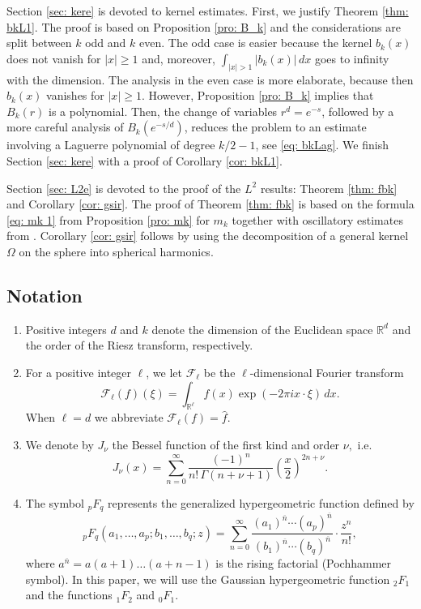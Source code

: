 \documentclass[a4paper,12pt,reqno]{amsart}
\numberwithin{equation}{section}
\theoremstyle{definition}
\newcommand{\R}{\mathbb{R}}
\newcommand{\mF}{\mathcal{F}}
\renewcommand{\ge}{\geqslant}
\begin{document}
Section \ref{sec: kere} is devoted to kernel estimates. First, we justify Theorem \ref{thm: bkL1}. The proof is based on Proposition \ref{pro: B_k} and the considerations are split between $k$ odd and $k$ even. The odd case is easier because the kernel $b_k(x)$ does not vanish for $|x|\ge 1$ and, moreover, $\int_{|x|>1}|b_k(x)|\,dx$ goes to infinity with the dimension. The analysis in the even case is more elaborate, because then $b_k(x)$ vanishes for $|x|\ge 1$. However, Proposition \ref{pro: B_k} implies that $B_k(r)$ is a polynomial. Then, the change of variables $r^d=e^{-s}$, followed by a more careful analysis of $B_k(e^{-s/d})$, reduces  the problem to an estimate involving a Laguerre polynomial of degree $k/2-1$, see \eqref{eq: bkLag}. We finish Section \ref{sec: kere} with a proof of Corollary \ref{cor: bkL1}.

Section \ref{sec: L2e} is devoted to the  proof of the $L^2$ results: Theorem \ref{thm: fbk} and Corollary \ref{cor: gsir}. The proof of Theorem \ref{thm: fbk} is based on the formula \eqref{eq: mk 1} from Proposition \ref{pro: mk} for $m_k$ together with oscillatory estimates from \cite{lms}. Corollary \ref{cor: gsir} follows by using the decomposition of a general kernel $\Omega$ on the sphere into spherical harmonics.


\subsection{Notation}

\begin{enumerate}

\item  Positive integers $d$ and $k$ denote the dimension of the Euclidean space $\R^d$ and the order of the Riesz transform, respectively. 
\item For a  positive integer $\ell$, we let  $\mF_{\ell}$ be the $\ell$-dimensional Fourier transform
\[
\mF_{\ell}(f)(\xi)=\int_{\R^{\ell}}f(x)\exp(-2\pi i x\cdot \xi)\,dx.
\]
When $\ell=d$ we abbreviate $\mF_{\ell}(f)=\widehat{f}.$

\item We denote by $J_{\nu}$ the Bessel function of the first kind and order $\nu,$ i.e.\
\[
J_{\nu}(x) = \sum_{n=0}^{\infty} \frac{(-1)^n}{n! \, \Gamma(n + \nu + 1)} \left( \frac{x}{2} \right)^{2n + \nu}.
\]

\item The symbol ${_p}F_q$ represents the generalized hypergeometric function defined by
\[
{_p}F_q(a_1, \ldots, a_p; b_1, \ldots, b_q; z)
= \sum_{n=0}^{\infty} \frac{(a_1)^{\overline{n}} \cdots (a_p)^{\overline{n}}}{(b_1)^{\overline{n}} \cdots (b_q)^{\overline{n}}} \cdot \frac{z^n}{n!},
\]
where  $a^{\overline{n}} = a (a + 1) \dots (a + n - 1)$ is the  rising factorial (Pochhammer symbol). In this paper, we will use the Gaussian hypergeometric function ${_2}F_1$ and the functions ${_1}F_2$ and ${_0}F_1.$ 


\end{enumerate}
\end{document}
